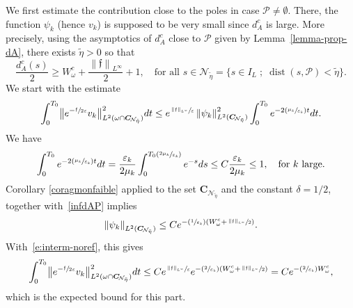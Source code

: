 \documentclass[11pt]{article}
\numberwithin{equation}{section}
\newcommand{\Psfrac}[2]{(\sfrac{#1}{#2})}
\newcommand{\sep}{\;;\;}
\theoremstyle{definition}
\newcommand{\calN}{\ensuremath{\mathcal N}}
\newcommand{\f}{\ensuremath{\mathfrak{f}}}
\DeclareMathOperator{\dist}{dist}
\newcommand\nor[2]{\left\|#1\right\|_{#2}}
\newcommand\bnor[2]{\bigl\|#1\bigr\|_{#2}}
\newcommand{\ce}{c}
\let\e\varepsilon
\let\eps\varepsilon
\newcommand\CO[1]{\boldsymbol{C}_{\!#1}}
\begin{document}
We first estimate the contribution close to the poles in case $\mathcal{P}\neq \emptyset$. There, the function $\psi_k$ (hence $v_k$) is supposed to be very small since $d_A^{\ce}$ is large. More precisely, using the asymptotics of $d_A^{\ce}$ close to $\mathcal{P}$ given by Lemma~\ref{lemma-prop-dA}, there exists $\widetilde{\eta}>0$ so that%
\begin{equation}
\label{infdAP}
\frac{d_A^{\ce}(s)}{2}\geq W^{\ce}_{\omega}+\frac{\nor{\f}{L^{\infty}}}{2} +1,\quad \text{for all } s\in \calN_{\tilde{\eta}}=\{ s\in I_L \sep \dist(s,\mathcal{P}) < \widetilde{\eta}\}.
\end{equation}
We start with the estimate
\begin{equation}
\label{e:interm-noref}
\int_0^{T_0}\bnor{e^{-\sfrac{\f}{2\eps}}v_{k} }{L^2(\omega\cap\CO{\calN_{\tilde{\eta}}})}^2 dt\leq e^{\sfrac{\nor{\f}{L^{\infty}}}{\eps}} \nor{\psi_k }{L^2(\CO{\calN_{\tilde{\eta}}})}^2\int_0^{T_0}e^{-2\Psfrac{\mu_k}{\e_{k}} t} dt.
\end{equation}
We have
\[
\int_0^{T_0}e^{-2\Psfrac{\mu_k}{\e_{k}} t} dt=\frac{\e_{k}}{2\mu_k}\int_0^{ T_0\Psfrac{2\mu_k}{\e_{k}}}e^{- s} ds\leq C\frac{\e_{k}}{2\mu_k}\leq 1,\quad\text{for $k$ large.}
\]
Corollary \ref{coragmonfaible} applied to the set $\CO{\calN_{\tilde{\eta}}}$ and the constant $\delta=1/2$, together with~\eqref{infdAP} implies
\[
\nor{\psi_k }{L^2(\CO{\calN_{\tilde{\eta}}})}\leq C e^{-\Psfrac{1}{\e_k} (W^{\ce}_{\omega} +\sfrac{\nor{\f}{L^{\infty}}}{2})}.
\]
With~\eqref{e:interm-noref}, this gives
\[
\int_0^{T_0}\bnor{e^{-\sfrac{\f}{2\eps}}v_{k} }{L^2(\omega\cap \CO{\calN_{\tilde{\eta}}})}^2 dt
\leq C e^{\sfrac{\nor{\f}{L^{\infty}}}{\eps}}e^{-\Psfrac{2}{\e_k} (W^{\ce}_{\omega} +\sfrac{\nor{\f}{L^{\infty}}}{2})} = Ce^{-\Psfrac{2}{\e_k} W^{\ce}_{\omega}},
\]
which is the expected bound for this part.
\end{document}
